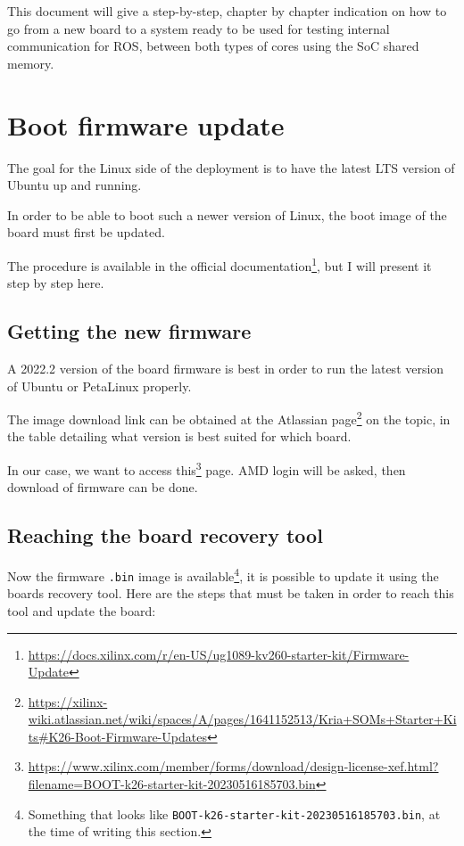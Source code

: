 \documentclass[10pt]{article}
\begin{document}
This document will give a step-by-step, chapter by chapter indication on how to go from a new board
to a system ready to be used for testing internal communication for ROS, between both types of cores
using the SoC shared memory.

\pagebreak
\section{Boot firmware update}
\label{sec:orga2089ed}
The goal for the Linux side of the deployment is to
have the latest LTS version of Ubuntu up and running.

In order to be able to boot such a newer version of Linux, the
boot image of the board must first be updated.

The procedure is available in the official documentation\footnote{\url{https://docs.xilinx.com/r/en-US/ug1089-kv260-starter-kit/Firmware-Update}},
but I will present it step by step here.

\subsection{Getting the new firmware}
\label{sec:orge2faada}
A 2022.2 version of the board firmware is best in order to run the latest
version of Ubuntu or PetaLinux properly.

The image download link can be obtained at the Atlassian page\footnote{\url{https://xilinx-wiki.atlassian.net/wiki/spaces/A/pages/1641152513/Kria+SOMs+Starter+Kits\#K26-Boot-Firmware-Updates}} on the topic,
in the table detailing what version is best suited for which board.

In our case, we want to access this\footnote{\url{https://www.xilinx.com/member/forms/download/design-license-xef.html?filename=BOOT-k26-starter-kit-20230516185703.bin}} page. AMD login will be asked, then
download of firmware can be done.

\subsection{Reaching the board recovery tool}
\label{sec:org172ab1e}
Now the firmware \texttt{.bin} image is available\footnote{Something that looks like \texttt{BOOT-k26-starter-kit-20230516185703.bin}, at the time of writing this section.}, it is possible to update it using the
boards recovery tool. Here are the steps that must be taken in order to reach
this tool and update the board:
\end{document}
